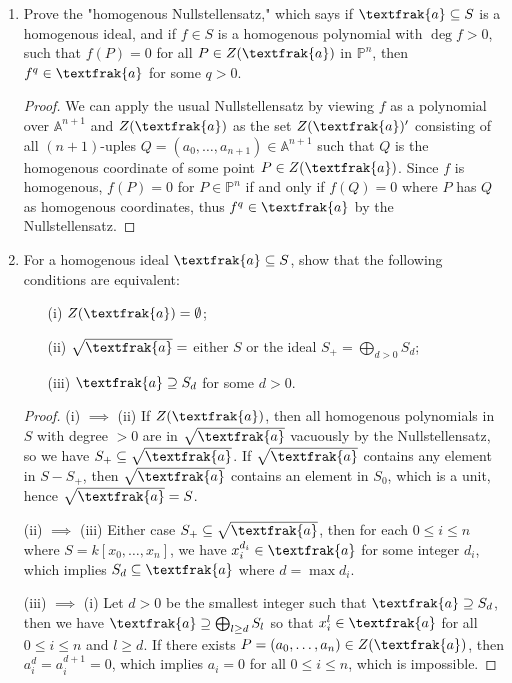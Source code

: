 \documentclass[12pt]{article}
\newcommand{\goth}[1]{\textfrak{#1}}
\newcommand{\A}{\mathbb{A}}
\newcommand{\PP}{\mathbb{P}}
\theoremstyle{definition}
\begin{document}
\begin{enumerate} [label=\textbf{\arabic*.}, leftmargin=-0.05em]

\item Prove the "homogenous Nullstellensatz," which says if $\goth{a} \subseteq S$ is a homogenous ideal, and if $f \in S$ is a homogenous polynomial with $\deg{f} > 0$, such that $f(P) = 0$ for all $P \in Z(\goth{a})$ in $\PP^n$, then $f^q \in \goth{a}$ for some $q > 0$.

\begin{proof}
    We can apply the usual Nullstellensatz by viewing $f$ as a polynomial over $\A^{n + 1}$ and $Z(\goth{a})$ as the set $Z(\goth{a})'$ consisting of all $(n + 1)$-uples $Q = (a_0, \dots, a_{n + 1}) \in \A^{n + 1}$ such that $Q$ is the homogenous coordinate of some point $P \in Z(\goth{a})$. Since $f$ is homogenous, $f(P) = 0$ for $P \in \PP^n$ if and only if $f(Q) = 0$ where $P$ has $Q$ as homogenous coordinates, thus $f^q \in \goth{a}$ by the Nullstellensatz.
\end{proof}

\item For a homogenous ideal $\goth{a} \subseteq S$, show that the following conditions are equivalent:
\begin{itemize}
    \item[(i)] $Z(\goth{a}) = \emptyset$;
    \item[(ii)] $\sqrt{\goth{a}} = $ either $S$ or the ideal $S_+ = \bigoplus_{d > 0} S_d$;
    \item[(iii)] $\goth{a} \supseteq S_d$ for some $d > 0$.
\end{itemize}

\begin{proof}
    (i) $\implies$ (ii) If $Z(\goth{a}) \empty$, then all homogenous polynomials in  $S$ with degree $ > 0 $ are in $\sqrt{\goth{a}}$ vacuously by the Nullstellensatz, so we have $S_+ \subseteq \sqrt{\goth{a}}$. If $\sqrt{\goth{a}}$ contains any element in $S - S_+$, then $\sqrt{\goth{a}}$ contains an element in $S_0$, which is a unit, hence $\sqrt{\goth{a}} = S$.

    (ii) $\implies$ (iii) Either case $S_+ \subseteq \sqrt{\goth{a}}$, then for each $0 \leq i \leq n$ where $S = k[x_0, \dots, x_{n}]$, we have $x_i^{d_i} \in \goth{a}$ for some integer $d_i$, which implies $S_d \subseteq \goth{a}$ where $d = \max{d_i}$.

    (iii) $\implies$ (i) Let $d > 0$ be the smallest integer such that $\goth{a} \supseteq S_d$, then we have $\goth{a} \supseteq \bigoplus_{l \geq d} S_l$ so that $x_i^l \in \goth{a}$ for all $0 \leq i \leq n$ and $l \geq d$. If there exists $P = (a_0, \dots, a_n) \in Z(\goth{a})$, then $a_i^d = a_i^{d + 1} = 0$, which implies $a_i = 0$ for all $0 \leq i \leq n$, which is impossible.
\end{proof}


\end{enumerate}
\end{document}
